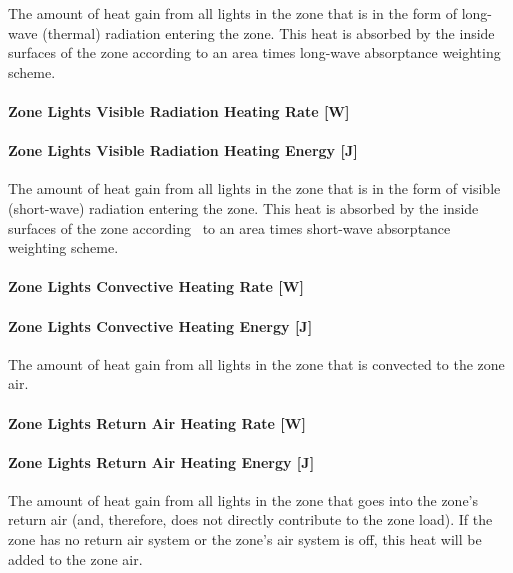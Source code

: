 The amount of heat gain from all lights in the zone that is in the form of long-wave (thermal) radiation entering the zone. This heat is absorbed by the inside surfaces of the zone according to an area times long-wave absorptance weighting scheme.

\paragraph{Zone Lights Visible Radiation Heating Rate {[}W{]}}\label{zone-lights-visible-radiation-heating-rate-w}

\paragraph{Zone Lights Visible Radiation Heating Energy {[}J{]}}\label{zone-lights-visible-radiation-heating-energy-j}

The amount of heat gain from all lights in the zone that is in the form of visible (short-wave) radiation entering the zone. This heat is absorbed by the inside surfaces of the zone according~ to an area times short-wave absorptance weighting scheme.

\paragraph{Zone Lights Convective Heating Rate {[}W{]}}\label{zone-lights-convective-heating-rate-w}

\paragraph{Zone Lights Convective Heating Energy {[}J{]}}\label{zone-lights-convective-heating-energy-j}

The amount of heat gain from all lights in the zone that is convected to the zone air.

\paragraph{Zone Lights Return Air Heating Rate {[}W{]}}\label{zone-lights-return-air-heating-rate-w}

\paragraph{Zone Lights Return Air Heating Energy {[}J{]}}\label{zone-lights-return-air-heating-energy-j}

The amount of heat gain from all lights in the zone that goes into the zone's return air (and, therefore, does not directly contribute to the zone load). If the zone has no return air system or the zone's air system is off, this heat will be added to the zone air.


